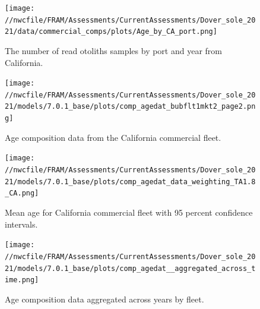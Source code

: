 \documentclass[11pt,
  english,
  a4paper,
]{article}
\begin{document}
\tagmcend\tagstructend


\begin{figure}
\centering
\texttt{[image: //nwcfile/FRAM/Assessments/CurrentAssessments/Dover\_sole\_2021/data/commercial\_comps/plots/Age\_by\_CA\_port.png]}
\caption{The number of read otoliths samples by port and year from California.\label{fig:ca-age-port}}
\end{figure}

\tagmcend\tagstructend


\begin{figure}
\centering
\texttt{[image: //nwcfile/FRAM/Assessments/CurrentAssessments/Dover\_sole\_2021/models/7.0.1\_base/plots/comp\_agedat\_bubflt1mkt2\_page2.png]}
\caption{Age composition data from the California commercial fleet.\label{fig:ca-age-data}}
\end{figure}

\tagmcend\tagstructend


\begin{figure}
\centering
\texttt{[image: //nwcfile/FRAM/Assessments/CurrentAssessments/Dover\_sole\_2021/models/7.0.1\_base/plots/comp\_agedat\_data\_weighting\_TA1.8\_CA.png]}
\caption{Mean age for California commercial fleet with 95 percent confidence intervals.\label{fig:mean-ca-age-data}}
\end{figure}

\tagmcend\tagstructend


\begin{figure}
\centering
\texttt{[image: //nwcfile/FRAM/Assessments/CurrentAssessments/Dover\_sole\_2021/models/7.0.1\_base/plots/comp\_agedat\_\_aggregated\_across\_time.png]}
\caption{Age composition data aggregated across years by fleet.\label{fig:agg-age-data}}
\end{figure}

\tagmcend\tagstructend
\end{document}
